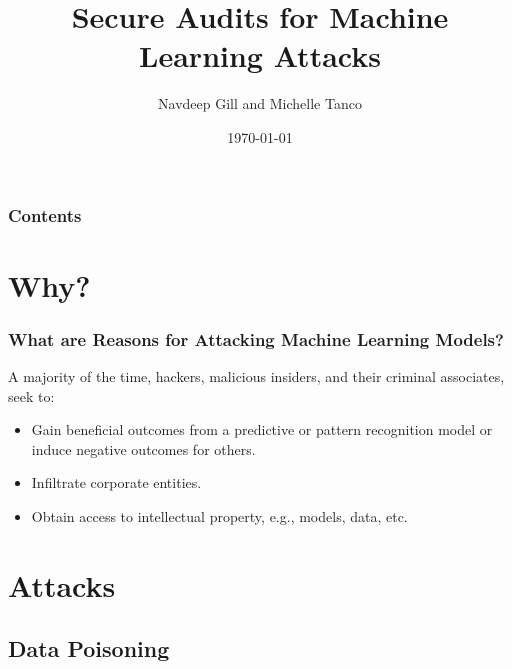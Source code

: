 \documentclass[11pt,
               aspectratio=169,
               hyperref={colorlinks}
               ]{beamer}
\author{\hspace{1pt}Navdeep Gill and Michelle Tanco}
\title{Secure Audits for Machine Learning Attacks}
\institute{\href{https://www.h2o.ai}{H\textsubscript{2}O.ai}}
\date{\today}
\begin{document}
	
	\maketitle
	
	\begin{frame}
	
		\frametitle{Contents}
		
		\tableofcontents{}
		
	\end{frame}

	\section{Why?}

	\begin{frame}
		
		\frametitle{What are Reasons for Attacking Machine Learning Models?}
A majority of the time, hackers, malicious insiders, and their criminal associates, seek to:
			\begin{itemize}
				\item Gain beneficial outcomes from a predictive or pattern recognition model or induce negative outcomes for others. %
				\item Infiltrate corporate entities.
				\item Obtain access to intellectual property, e.g., models, data, etc.
			\end{itemize}	
		\end{frame}

	\section{Attacks}

		\subsection{Data Poisoning}
\end{document}
